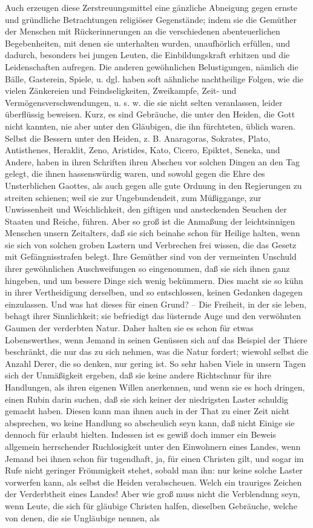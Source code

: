 Auch erzeugen diese Zerstreuungsmittel eine gänzliche Abneigung gegen ernste und gründliche Betrachtungen religiöser Gegenstände; indem sie die Gemüther der Menschen mit Rückerinnerungen an die verschiedenen abenteuerlichen Begebenheiten, mit denen sie unterhalten wurden, unaufhörlich erfüllen, und dadurch, besonders bei jungen Leuten, die Einbildungskraft erhitzen und die Leidenschaften aufregen. Die anderen gewöhnlichen Belustigungen, nämlich die Bälle, Gasterein, Spiele, u. dgl. haben soft aähnliche nachtheilige Folgen, wie die vielen Zänkereien und Feindseligkeiten, Zweikampfe, Zeit- und Vermögensverschwendungen, u. s. w. die sie nicht selten veranlassen, leider überflüssig beweisen. Kurz, es sind Gebräuche, die unter den Heiden, die Gott nicht kannten, nie aber unter den Gläubigen, die ihn fürchteten, üblich waren. Selbst die Bessern unter den Heiden, z. B. Anaragoras, Sokrates, Plato, Antisthenes, Heraklit, Zeno, Aristides, Kato, Cicero, Epiktet, Seneka, und Andere, haben in ihren Schriften ihren Abscheu vor solchen Dingen an den Tag gelegt, die ihnen hassenswürdig waren, und sowohl gegen die Ehre des Unsterblichen Gaottes, als auch gegen alle gute Ordnung in den Regierungen zu streiten schienen; weil sie zur Ungebundendeit, zum Müßiggange, zur Unwissenheit und Weichlichkeit, den giftigen und ansteckenden Seuchen der Staaten und Reiche, führen. Aber so groß ist die Anmaßung der leichtsinnigen Menschen unsern Zeitalters, daß sie sich beinahe schon für Heilige halten, wenn sie sich von solchen groben Lastern und Verbrechen frei wissen, die das Gesetz mit Gefängnisstrafen belegt. Ihre Gemüther sind von der vermeinten Unschuld ihrer gewöhnlichen Auschweifungen so eingenommen, daß sie sich ihnen ganz hingeben, und um bessere Dinge sich wenig bekümmern. Dies macht sie so kühn in ihrer Vertheidigung derselben, und so entschlossen, keinen Gedanken dagegen einzulassen. Und was hat dieses für einen Grund? -- Die Freiheit, in der sie leben, behagt ihrer Sinnlichkeit; sie befriedigt das lüsternde Auge und den verwöhnten Gaumen der verderbten Natur. Daher halten sie es schon für etwas Lobenswerthes, wenn Jemand in seinen Genüssen sich auf das Beispiel der Thiere beschränkt, die nur das zu sich nehmen, was die Natur fordert; wiewohl selbst die Anzahl Derer, die so denken, nur gering ist. So sehr haben Viele in unsern Tagen sich der Unmäßigkeit ergeben, daß sie keine andere Richtschnur für ihre Handlungen, als ihren eigenen Willen anerkennen, und wenn sie es hoch dringen, einen Rubin darin suchen, daß sie sich keiner der niedrigsten Laster schuldig gemacht haben. Diesen kann man ihnen auch in der That zu einer Zeit nicht absprechen, wo keine Handlung so abscheulich seyn kann, daß nicht Einige sie dennoch für erlaubt hielten. Indessen ist es gewiß doch immer ein Beweis allgemein herrschender Ruchlosigkeit unter den Einwohnern eines Landes, wenn Jemand bei ihnen schon für tugendhaft, ja, für einen Christen gilt, und sogar im Rufe nicht geringer Frömmigkeit stehet, sobald man ihn: nur keine solche Laster vorwerfen kann, als selbst die Heiden verabscheuen. Welch ein trauriges Zeichen der Verderbtheit eines Landes! Aber wie groß muss nicht die Verblendnng seyn, wenn Leute, die sich für gläubige Christen halfen, dieselben Gebräuche, welche von denen, die sie Ungläubige nennen, als 